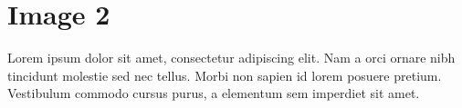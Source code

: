 \chapter{Image 2}
\label{app:appendix2}

Lorem ipsum dolor sit amet, consectetur adipiscing elit. Nam a orci ornare nibh tincidunt molestie sed nec tellus. Morbi non sapien id lorem posuere pretium. Vestibulum commodo cursus purus, a elementum sem imperdiet sit amet.

\begin{center}
\end{center}
